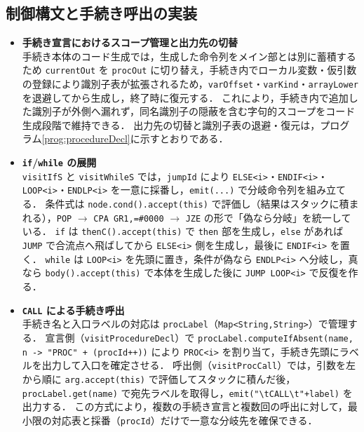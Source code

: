 \documentclass[a4j,10pt]{jarticle}
\begin{document}


\subsection{制御構文と手続き呼出の実装}
\begin{itemize}
  \item \textbf{手続き宣言におけるスコープ管理と出力先の切替}\\
  手続き本体のコード生成では，生成した命令列をメイン部とは別に蓄積するため \verb|currentOut| を \verb|procOut| に切り替え，手続き内でローカル変数・仮引数の登録により識別子表が拡張されるため，\verb|varOffset|・\verb|varKind|・\verb|arrayLower| を退避してから生成し，終了時に復元する．
  これにより，手続き内で追加した識別子が外側へ漏れず，同名識別子の隠蔽を含む字句的スコープをコード生成段階で維持できる．
  出力先の切替と識別子表の退避・復元は，プログラム\ref{prog:procedureDecl}に示すとおりである．
  

  \item \textbf{\texttt{if}/\texttt{while} の展開}\\
  \verb|visitIfS| と \verb|visitWhileS| では，\verb|jumpId| により \texttt{ELSE<i>}・\texttt{ENDIF<i>}・\texttt{LOOP<i>}・\texttt{ENDLP<i>} を一意に採番し，\verb|emit(...)| で分岐命令列を組み立てる．
  条件式は \verb|node.cond().accept(this)| で評価し（結果はスタックに積まれる），\verb|POP| $\rightarrow$ \verb|CPA GR1,=#0000| $\rightarrow$ \verb|JZE| の形で「偽なら分岐」を統一している．
  \texttt{if} は \verb|thenC().accept(this)| で \verb|then| 部を生成し，\texttt{else} があれば \verb|JUMP| で合流点へ飛ばしてから \texttt{ELSE<i>} 側を生成し，最後に \texttt{ENDIF<i>} を置く．
  \texttt{while} は \texttt{LOOP<i>} を先頭に置き，条件が偽なら \texttt{ENDLP<i>} へ分岐し，真なら \verb|body().accept(this)| で本体を生成した後に \verb|JUMP LOOP<i>| で反復を作る．

  \item \textbf{\texttt{CALL} による手続き呼出}\\
  手続き名と入口ラベルの対応は \verb|procLabel|（\verb|Map<String,String>|）で管理する．
  宣言側（\verb|visitProcedureDecl|）で \verb|procLabel.computeIfAbsent(name, n -> "PROC" + (procId++))| により \texttt{PROC<i>} を割り当て，手続き先頭にラベルを出力して入口を確定させる．
  呼出側（\verb|visitProcCall|）では，引数を左から順に \verb|arg.accept(this)| で評価してスタックに積んだ後，\verb|procLabel.get(name)| で宛先ラベルを取得し，\verb|emit("\tCALL\t"+label)| を出力する．
  この方式により，複数の手続き宣言と複数回の呼出に対して，最小限の対応表と採番（\verb|procId|）だけで一意な分岐先を確保できる．
\end{itemize}
\end{document}
